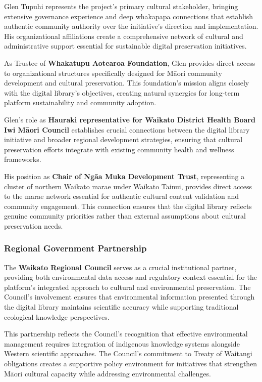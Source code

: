 Glen Tupuhi represents the project's primary cultural stakeholder, bringing extensive governance experience and deep whakapapa connections that establish authentic community authority over the initiative's direction and implementation. His organizational affiliations create a comprehensive network of cultural and administrative support essential for sustainable digital preservation initiatives.

As Trustee of \textbf{Whakatupu Aotearoa Foundation}, Glen provides direct access to organizational structures specifically designed for M\=aori community development and cultural preservation. This foundation's mission aligns closely with the digital library's objectives, creating natural synergies for long-term platform sustainability and community adoption.

Glen's role as \textbf{Hauraki representative for Waikato District Health Board Iwi M\=aori Council} establishes crucial connections between the digital library initiative and broader regional development strategies, ensuring that cultural preservation efforts integrate with existing community health and wellness frameworks.

His position as \textbf{Chair of Ng\=aa Muka Development Trust}, representing a cluster of northern Waikato marae under Waikato Tainui, provides direct access to the marae network essential for authentic cultural content validation and community engagement. This connection ensures that the digital library reflects genuine community priorities rather than external assumptions about cultural preservation needs.

\subsubsection{Regional Government Partnership}

The \textbf{Waikato Regional Council} serves as a crucial institutional partner, providing both environmental data access and regulatory context essential for the platform's integrated approach to cultural and environmental preservation. The Council's involvement ensures that environmental information presented through the digital library maintains scientific accuracy while supporting traditional ecological knowledge perspectives.

This partnership reflects the Council's recognition that effective environmental management requires integration of indigenous knowledge systems alongside Western scientific approaches. The Council's commitment to Treaty of Waitangi obligations creates a supportive policy environment for initiatives that strengthen M\=aori cultural capacity while addressing environmental challenges.

